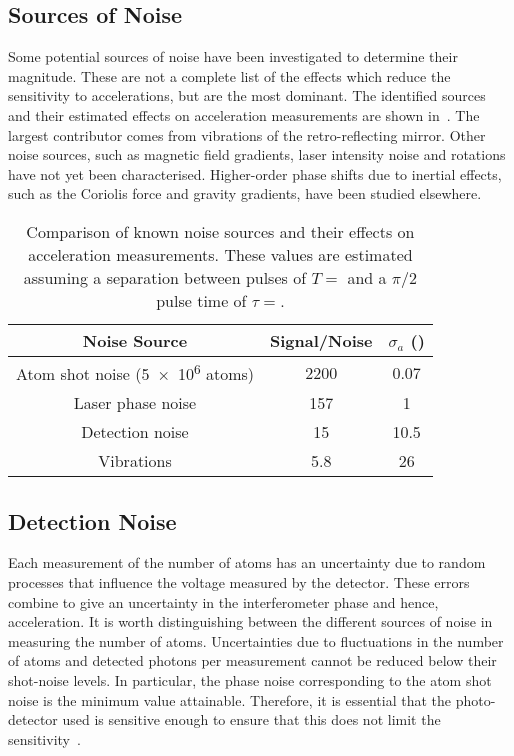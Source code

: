 \subsection{Sources of Noise}\label{subsec:noise_sources}
Some potential sources of noise have been investigated to determine
their magnitude. These are not a complete list of the effects which
reduce the sensitivity to accelerations, but are the most dominant. The
identified sources and their estimated effects on acceleration
measurements are shown in~. The largest
contributor comes from vibrations of the retro-reflecting mirror.
Other noise sources, such as magnetic field gradients, laser intensity
noise and rotations have not yet been characterised. Higher-order
phase shifts due to inertial effects, such as the Coriolis force and
gravity gradients, have been
studied elsewhere\cite{Bongs2006}.
\begin{table}[htpb!]
  \centering
  \begin{tabular}{c|c|c}
    \toprule
    Noise Source & Signal/Noise & \(\sigma_a\)
    (\sivalue{}{\micro\meter\per\s\squared}) \\
    \midrule
    Atom shot noise (\num{5e6} atoms) & 2200 & 0.07 \\
    Laser phase noise & 157 & 1 \\
    Detection noise & 15 & 10.5 \\
    Vibrations & 5.8 & 26\\
    \bottomrule
  \end{tabular}
  \caption[Comparison of known noise sources.]{Comparison of known noise sources and their effects on
  acceleration measurements. These values are estimated assuming a
separation between pulses of \(T = \) and a \(\pi/2\)
pulse time of \(\tau = \).}
  \label{tab:noise_sources}
\end{table}
\subsection{Detection Noise}\label{subsec:detection_noise}

Each measurement of the number of atoms has an uncertainty due to
random processes that influence the voltage measured by the detector. These errors
combine to give an uncertainty in the interferometer phase and
hence, acceleration. It is worth distinguishing between the different
sources of noise in measuring the number of atoms. Uncertainties due
to fluctuations in the number of atoms and detected photons per
measurement cannot be reduced below their shot-noise levels. In
particular, the phase noise corresponding to the atom shot noise is
the minimum value attainable. Therefore, it is essential that the
photo-detector used is sensitive enough to ensure that this does not
limit the sensitivity~\cite{Rocco2014}.
